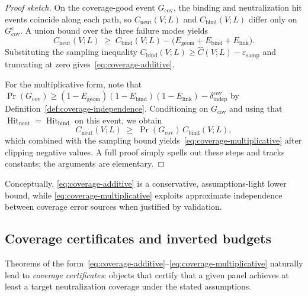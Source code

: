 \documentclass[11pt]{article}
\newcommand{\Hit}{\operatorname{Hit}}
\begin{document}
\begin{proof}[Proof sketch]
On the coverage-good event $G_{\mathrm{cov}}$, the binding and neutralization hit events coincide
along each path, so $C_{\mathrm{neut}}(V;L)$ and $C_{\mathrm{bind}}(V;L)$ differ only on
$G_{\mathrm{cov}}^{\mathrm{c}}$. A union bound over the three failure modes yields
\[
C_{\mathrm{neut}}(V;L)
\;\ge\;
C_{\mathrm{bind}}(V;L) - \bigl(E_{\mathrm{geom}} + E_{\mathrm{bind}} + E_{\mathrm{link}}\bigr).
\]
Substituting the sampling inequality
$C_{\mathrm{bind}}(V;L) \ge \widehat{C}(V;L) - \varepsilon_{\mathrm{samp}}$ and truncating at zero
gives~\eqref{eq:coverage-additive}.

For the multiplicative form, note that
$\Pr(G_{\mathrm{cov}}) \ge (1 - E_{\mathrm{geom}})(1 - E_{\mathrm{bind}})(1 - E_{\mathrm{link}})
- \delta_{\mathrm{indep}}^{\mathrm{cov}}$ by
Definition~\ref{def:coverage-independence}. Conditioning on $G_{\mathrm{cov}}$ and using that
$\Hit_{\mathrm{neut}} = \Hit_{\mathrm{bind}}$ on this event, we obtain
\[
C_{\mathrm{neut}}(V;L)
\;\ge\;
\Pr(G_{\mathrm{cov}})
\,
C_{\mathrm{bind}}(V;L),
\]
which combined with the sampling bound yields~\eqref{eq:coverage-multiplicative} after clipping
negative values. A full proof simply spells out these steps and tracks constants; the arguments
are elementary.
\end{proof}

Conceptually, \eqref{eq:coverage-additive} is a conservative, assumptions-light lower bound, while
\eqref{eq:coverage-multiplicative} exploits approximate independence between coverage error
sources when justified by validation.

\subsection{Coverage certificates and inverted budgets}

Theorems of the form~\eqref{eq:coverage-additive}--\eqref{eq:coverage-multiplicative} naturally
lead to \emph{coverage certificates}: objects that certify that a given panel achieves at least a
target neutralization coverage under the stated assumptions.
\end{document}
